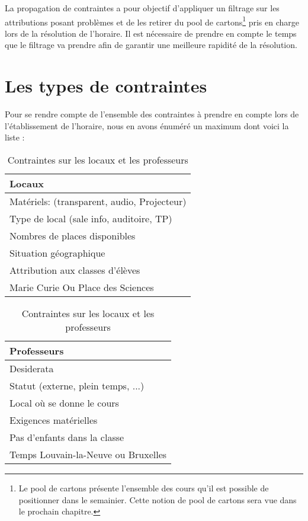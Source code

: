 \newline
\indent
La propagation de contraintes a pour objectif d'appliquer un filtrage sur les attributions posant problèmes et de les retirer du pool de cartons\footnote{Le pool de cartons présente l'ensemble des cours qu'il est possible de positionner dans le semainier. Cette notion de pool de cartons sera vue dans le prochain chapitre.} pris en charge lors de la résolution de l'horaire. Il est nécessaire de prendre en compte le temps que le filtrage va prendre afin de garantir une meilleure rapidité de la résolution.

\section{Les types de contraintes}

Pour se rendre compte de l'ensemble des contraintes à prendre en compte lors de l'établissement de l'horaire, nous en avons énuméré un maximum dont voici la liste :\\

\begin{table}[h!]
\begin{minipage}[t]{.3\linewidth}
    \begin{tabular}{|l|}
    \hline
\textbf{Locaux}\\
\hline
\hline
Matériels: (transparent, audio, Projecteur)\\
\hline
Type de local (sale info, auditoire, TP)\\
\hline
Nombres de places disponibles\\
\hline
Situation géographique \\
\hline
Attribution aux classes d'élèves\\
\hline
Marie Curie Ou Place des Sciences\\
\hline   
    \end{tabular}
\end{minipage}
\hfill
\begin{minipage}[t]{.4\linewidth}
    \begin{tabular}{|l|}
    \hline
\textbf{Professeurs}\\
\hline
\hline
Desiderata\\
\hline
Statut (externe, plein temps, ...)\\
\hline
Local où se donne le cours\\
\hline
Exigences matérielles\\
\hline
Pas d'enfants dans la classe\\
\hline
Temps Louvain-la-Neuve ou Bruxelles\\
\hline
    \end{tabular}
\end{minipage}
\caption{Contraintes sur les locaux et les professeurs}
\label{locaux_prof}
\end{table}

